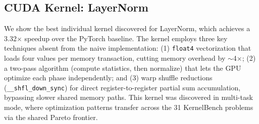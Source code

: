 \documentclass[sigconf,anonymous,review]{acmart}
\begin{document}
\subsection{CUDA Kernel: LayerNorm}
\label{app:sol-cuda}

We show the best individual kernel discovered for LayerNorm, which achieves a 3.32$\times$ speedup over the PyTorch baseline. The kernel employs three key techniques absent from the naive implementation: (1) \texttt{float4} vectorization that loads four values per memory transaction, cutting memory overhead by $\sim$4$\times$; (2) a two-pass algorithm (compute statistics, then normalize) that lets the GPU optimize each phase independently; and (3) warp shuffle reductions (\texttt{\_\_shfl\_down\_sync}) for direct register-to-register partial sum accumulation, bypassing slower shared memory paths. This kernel was discovered in multi-task mode, where optimization patterns transfer across the 31 KernelBench problems via the shared Pareto frontier.
\end{document}

